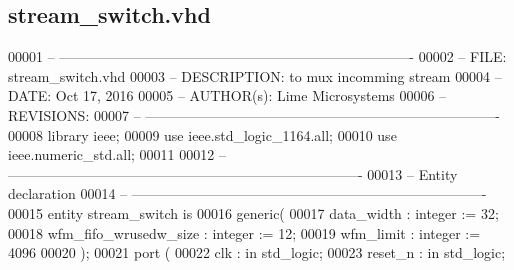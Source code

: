 \subsection{stream\+\_\+switch.\+vhd}
\label{stream__switch_8vhd_source}

\begin{DoxyCode}
00001 \textcolor{keyword}{-- ---------------------------------------------------------------------------- }
00002 \textcolor{keyword}{-- FILE:    stream\_switch.vhd}
00003 \textcolor{keyword}{-- DESCRIPTION: to mux incomming stream }
00004 \textcolor{keyword}{-- DATE:    Oct 17, 2016}
00005 \textcolor{keyword}{-- AUTHOR(s):   Lime Microsystems}
00006 \textcolor{keyword}{-- REVISIONS:}
00007 \textcolor{keyword}{-- ---------------------------------------------------------------------------- }
00008 \textcolor{vhdlkeyword}{library }\textcolor{keywordflow}{ieee};
00009 \textcolor{vhdlkeyword}{use }ieee.std\_logic\_1164.\textcolor{keywordflow}{all};
00010 \textcolor{vhdlkeyword}{use }ieee.numeric\_std.\textcolor{keywordflow}{all};
00011 
00012 \textcolor{keyword}{-- ----------------------------------------------------------------------------}
00013 \textcolor{keyword}{-- Entity declaration}
00014 \textcolor{keyword}{-- ----------------------------------------------------------------------------}
00015 \textcolor{keywordflow}{entity }stream_switch \textcolor{keywordflow}{is}
00016     \textcolor{keywordflow}{generic}\textcolor{vhdlchar}{(}
00017             \textcolor{vhdlchar}{data_width}                  \textcolor{vhdlchar}{:} \textcolor{comment}{integer} \textcolor{vhdlchar}{:=} \textcolor{vhdllogic}{}\textcolor{vhdllogic}{32};
00018             \textcolor{vhdlchar}{wfm_fifo_wrusedw_size}   \textcolor{vhdlchar}{:} \textcolor{comment}{integer} \textcolor{vhdlchar}{:=} \textcolor{vhdllogic}{}\textcolor{vhdllogic}{12};
00019             \textcolor{vhdlchar}{wfm_limit}                   \textcolor{vhdlchar}{:} \textcolor{comment}{integer} \textcolor{vhdlchar}{:=} \textcolor{vhdllogic}{}\textcolor{vhdllogic}{4096}
00020     \textcolor{vhdlchar}{)};
00021     \textcolor{keywordflow}{port} \textcolor{vhdlchar}{(}
00022         \textcolor{vhdlchar}{clk}                 \textcolor{vhdlchar}{:} \textcolor{keywordflow}{in} \textcolor{comment}{std\_logic};
00023         \textcolor{vhdlchar}{reset_n}             \textcolor{vhdlchar}{:} \textcolor{keywordflow}{in} \textcolor{comment}{std\_logic};

\end{DoxyCode}
